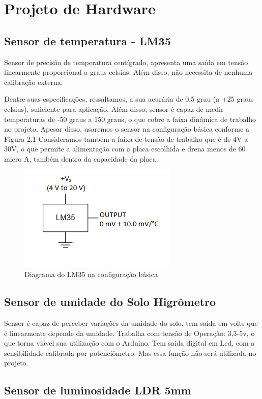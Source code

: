 \documentclass[a4paper,12pt]{report}
\begin{document}
	
	\section{Projeto de Hardware}
	
		\subsection{Sensor de temperatura - LM35}
		
		Sensor de precisão de temperatura centígrado, apresenta uma saída em tensão linearmente proporcional a graus celsius. Além disso, não necessita de nenhuma calibração externa.
		
		Dentre suas especificações, ressaltamos, a sua acurária de 0.5 grau (a +25 graus celsius), suficiente para aplicação. Além disso, sensor é capaz de medir temperaturas de -50 graus a 150 graus, o que cobre a faixa dinâmica de trabalho no projeto. Apesar disso, usaremos o sensor na configuração básica conforme a Figura 2.1 Consideramos também a faixa de tensão de trabalho que é de 4V a 30V, o que permite a alimentação com a placa escolhida e drena menos de 60 micro A, também dentro da capacidade da placa.
		\begin{figure}[!htb]
			\centering
			\includegraphics{LM35_config_basica}
			\caption{Diagrama do LM35 na configuração básica}
			\label{Rotulo}
		\end{figure}
		\subsection{Sensor de umidade do Solo Higrômetro}
		Sensor é capaz de perceber variações da umidade do solo, tem saída em volts que é linearmente depende da umidade.
		Trabalha com tensão de Operação: 3,3-5v, o que torna viável sua utilização com o Arduino. Tem saída digital em Led, com a sensibilidade calibrada por potenciômetro. Mas essa função não será utilizada no projeto.
	
		\subsection{Sensor de luminosidade LDR 5mm }
		
\end{document}

